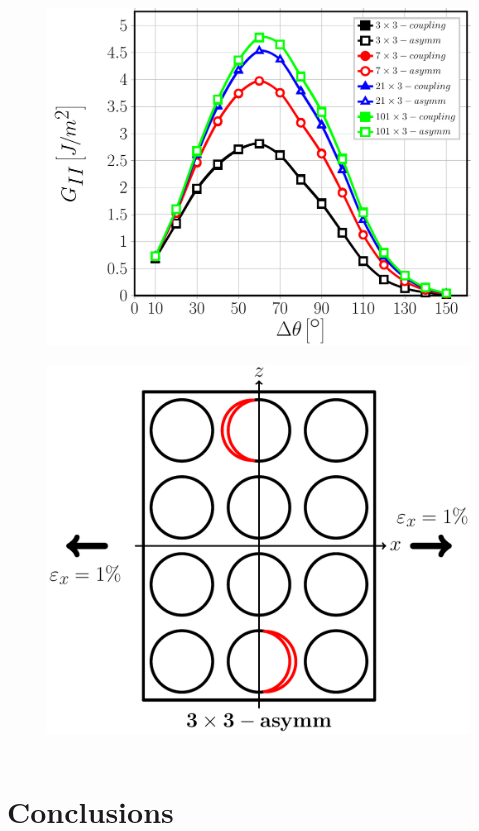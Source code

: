 \documentclass[first,firstsupp,lastsupp,last,hyperref,table]{ETHclass}
\begin{document}
\begin{frame}
\begin{columns}
\begin{column}{0.5\textwidth}
\begin{figure}
\includegraphics[width=\columnwidth]{nxk-coupling-vf60-GII.pdf}
\end{figure}
\vspace{-0.8cm}
\begin{figure}
\centering
\includegraphics[width=0.5\columnwidth]{twofibersbetweendebonds-oppositeside-dtheta80.pdf}
\end{figure}
\end{column}
\end{columns}
\end{frame}

\section{Conclusions}
\end{document}
